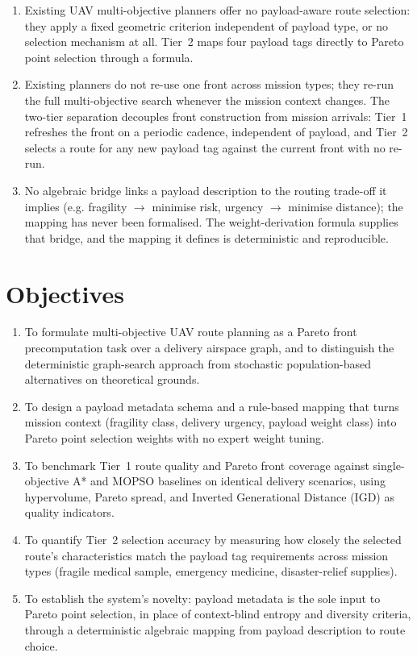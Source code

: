 \documentclass{ssnreview}
\begin{document}
\begin{enumerate}[label=\textbf{Gap~\arabic*.}]
  \item Existing UAV multi-objective planners offer no payload-aware route selection:
  they apply a fixed geometric criterion independent of payload type, or no selection
  mechanism at all. Tier~2 maps four payload tags directly to Pareto point selection
  through a formula.
  \item Existing planners do not re-use one front across mission types; they re-run the
  full multi-objective search whenever the mission context changes. The two-tier
  separation decouples front construction from mission arrivals: Tier~1 refreshes the
  front on a periodic cadence, independent of payload, and Tier~2 selects a route for
  any new payload tag against the current front with no re-run.
  \item No algebraic bridge links a payload description to the routing trade-off it
  implies (e.g. fragility $\rightarrow$ minimise risk, urgency $\rightarrow$ minimise
  distance); the mapping has never been formalised. The weight-derivation formula
  supplies that bridge, and the mapping it defines is deterministic and reproducible.
\end{enumerate}

\section{Objectives}
\begin{enumerate}[label=\arabic*.]
  \item To formulate multi-objective UAV route planning as a Pareto front
  precomputation task over a delivery airspace graph, and to distinguish the
  deterministic graph-search approach from stochastic population-based alternatives
  on theoretical grounds.
  \item To design a payload metadata schema and a rule-based mapping that turns mission
  context (fragility class, delivery urgency, payload weight class) into Pareto point
  selection weights with no expert weight tuning.
  \item To benchmark Tier~1 route quality and Pareto front coverage against
  single-objective A* and MOPSO baselines on identical delivery scenarios, using
  hypervolume, Pareto spread, and Inverted Generational Distance (IGD) as quality
  indicators.
  \item To quantify Tier~2 selection accuracy by measuring how closely the selected
  route's characteristics match the payload tag requirements across mission types
  (fragile medical sample, emergency medicine, disaster-relief supplies).
  \item To establish the system's novelty: payload metadata is the sole input to Pareto
  point selection, in place of context-blind entropy and diversity criteria, through a
  deterministic algebraic mapping from payload description to route choice.
\end{enumerate}
\end{document}

